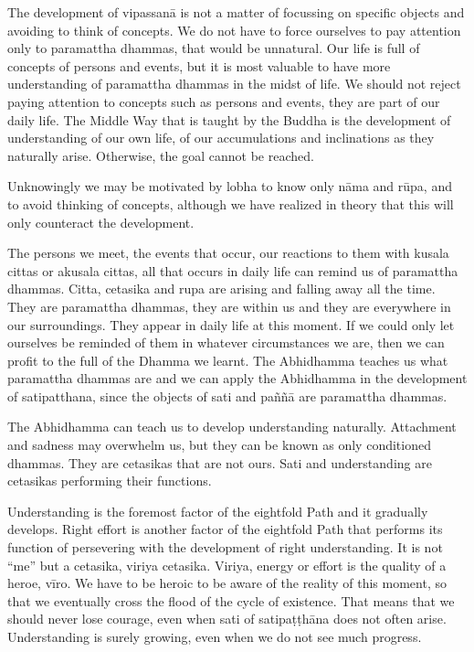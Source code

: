 The development of vipassanā is not a matter of focussing on specific objects and avoiding to think of concepts. We do not have to force ourselves to pay attention only to paramattha dhammas, that would be unnatural. Our life is full of concepts of persons and events, but it is most valuable to have more understanding of paramattha dhammas in the midst of life. We should not reject paying attention to concepts such as persons and events, they are part of our daily life. The Middle Way that is taught by the Buddha is the development of understanding of our own life, of our accumulations and inclinations as they naturally arise. Otherwise, the goal cannot be reached.

Unknowingly we may be motivated by lobha to know only nāma and rūpa, and to avoid thinking of concepts, although we have realized in theory that this will only counteract the development.

The persons we meet, the events that occur, our reactions to them with kusala cittas or akusala cittas, all that occurs in daily life can remind us of paramattha dhammas. Citta, cetasika and rupa are arising and falling away all the time. They are paramattha dhammas, they are within us and they are everywhere in our surroundings. They appear in daily life at this moment. If we could only let ourselves be reminded of them in whatever circumstances we are, then we can profit to the full of the Dhamma we learnt. The Abhidhamma teaches us what paramattha dhammas are and we can apply the Abhidhamma in the development of satipatthana, since the objects of sati and paññā are paramattha dhammas.

The Abhidhamma can teach us to develop understanding naturally. Attachment and sadness may overwhelm us, but they can be known as only conditioned dhammas. They are cetasikas that are not ours. Sati and understanding are cetasikas performing their functions.

Understanding is the foremost factor of the eightfold Path and it gradually develops. Right effort is another factor of the eightfold Path that performs its function of persevering with the development of right understanding. It is not ``me'' but a cetasika, viriya cetasika. Viriya, energy or effort is the quality of a heroe, vīro. We have to be heroic to be aware of the reality of this moment, so that we eventually cross the flood of the cycle of existence. That means that we should never lose courage, even when sati of satipaṭṭhāna does not often arise. Understanding is surely growing, even when we do not see much progress.

